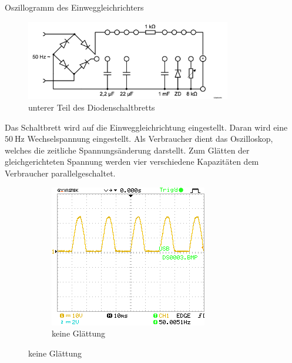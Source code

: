 \documentclass{article}
\theoremstyle{definition}
\begin{document}
\begin{aufgabe}{Oszillogramm des Einweggleichrichters}
    \label{Aufgabe3}
    \aufbau
    \begin{figure}[H]
        \centering
        \includegraphics[width=0.8\textwidth]{figs/Aufbau3.png}
        \caption{unterer Teil des Diodenschaltbretts\cite{anleitung}}
        \label{aufbau3}
    \end{figure}
    Das Schaltbrett wird auf die Einweggleichrichtung eingestellt. Daran wird eine $\SI{50}{\hertz}$ Wechselspannung eingestellt. Als Verbraucher dient das Oszilloskop, welches die zeitliche Spannungsänderung darstellt. Zum Glätten der gleichgerichteten Spannung werden vier verschiedene Kapazitäten dem Verbraucher parallelgeschaltet.
    \messwerte
    \begin{figure}[H]
        \begin{subfigure}[b]{0.49 \textwidth}
            \includegraphics[width=\textwidth]{MesswerteVersuch2/DS0003.png}
            \caption{keine Glättung}
            \label{a3_a}
        \end{subfigure}

\end{figure}
\end{aufgabe}
\end{document}
